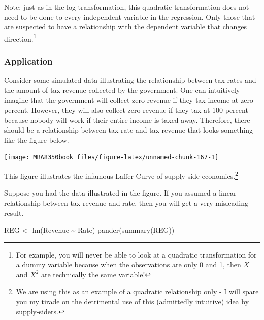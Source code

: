 \documentclass[
]{book}
\newenvironment{Shaded}{\begin{snugshade}}{\end{snugshade}}
\newcommand{\FunctionTok}[1]{\textcolor[rgb]{0.00,0.00,0.00}{#1}}
\newcommand{\NormalTok}[1]{#1}
\newcommand{\OtherTok}[1]{\textcolor[rgb]{0.56,0.35,0.01}{#1}}
\newcommand{\SpecialCharTok}[1]{\textcolor[rgb]{0.00,0.00,0.00}{#1}}
\begin{document}
Note: just as in the log transformation, this quadratic transformation does not need to be done to every independent variable in the regression. Only those that are suspected to have a relationship with the dependent variable that changes direction.\footnote{For example, you will never be able to look at a quadratic transformation for a dummy variable because when the observations are only 0 and 1, then \(X\) and \(X^2\) are technically the same variable!}

\hypertarget{application-6}{%
\subsubsection*{Application}\label{application-6}}

Consider some simulated data illustrating the relationship between tax rates and the amount of tax revenue collected by the government. One can intuitively imagine that the government will collect zero revenue if they tax income at zero percent. However, they will also collect zero revenue if they tax at 100 percent because nobody will work if their entire income is taxed away. Therefore, there should be a relationship between tax rate and tax revenue that looks something like the figure below.

\begin{center}\texttt{[image: MBA8350book\_files/figure-latex/unnamed-chunk-167-1]} \end{center}

This figure illustrates the infamous Laffer Curve of supply-side economics.\footnote{We are using this as an example of a quadratic relationship only - I will spare you my tirade on the detrimental use of this (admittedly intuitive) idea by supply-siders.}

Suppose you had the data illustrated in the figure. If you assumed a linear relationship between tax revenue and rate, then you will get a very misleading result.

\begin{Shaded}
\begin{Highlighting}[]
\NormalTok{REG }\OtherTok{\textless{}{-}} \FunctionTok{lm}\NormalTok{(Revenue }\SpecialCharTok{\textasciitilde{}}\NormalTok{ Rate)}
\FunctionTok{pander}\NormalTok{(}\FunctionTok{summary}\NormalTok{(REG))}
\end{Highlighting}
\end{Shaded}
\end{document}
